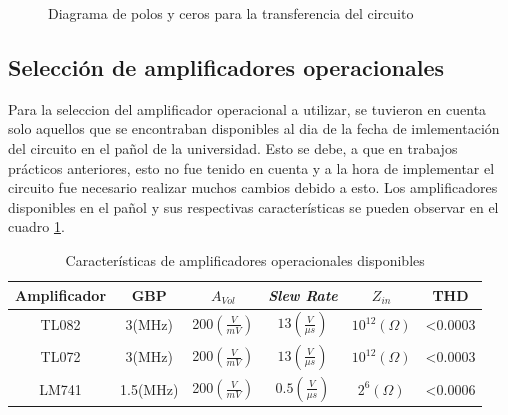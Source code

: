 \begin{center}
\begin{figure}[h]
\begin{centering}
\par\end{centering}
\centering{}\caption{Diagrama de polos y ceros para la transferencia del circuito}
\end{figure}
\par\end{center}

\subsection{Selección de amplificadores operacionales}

Para la seleccion del amplificador operacional a utilizar, se tuvieron
en cuenta solo aquellos que se encontraban disponibles al dia de la
fecha de imlementación del circuito en el pañol de la universidad.
Esto se debe, a que en trabajos prácticos anteriores, esto no fue
tenido en cuenta y a la hora de implementar el circuito fue necesario
realizar muchos cambios debido a esto. Los amplificadores disponibles
en el pañol y sus respectivas características se pueden observar en
el cuadro \ref{1_8}.

\begin{table}[h]
\begin{centering}
\begin{tabular}{|c|c|c|c|c|c|}
\hline 
Amplificador & GBP & $A_{Vol}$ & \emph{Slew Rate} & $Z_{in}$ & THD\tabularnewline
\hline 
\hline 
TL082 & 3(MHz) & 200$\left(\frac{V}{mV}\right)$ & $13(\frac{V}{\mu s})$ & $10^{12}(\Omega)$ & <0.0003\tabularnewline
\hline 
TL072 & 3(MHz) & 200$\left(\frac{V}{mV}\right)$ & $13(\frac{V}{\mu s})$ & $10^{12}(\Omega)$ & <0.0003\tabularnewline
\hline 
LM741 & 1.5(MHz) & 200$\left(\frac{V}{mV}\right)$ & $0.5(\frac{V}{\mu s})$ & $2^{6}(\Omega)$ & <0.0006\tabularnewline
\hline 
\end{tabular}
\par\end{centering}
\caption{Características de amplificadores operacionales disponibles}
\label{1_8}
\end{table}


